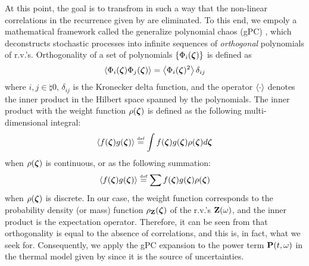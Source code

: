 At this point, the goal is to transfrom  in such a way that the non-linear correlations in the recurrence given by  are eliminated. To this end, we empoly a mathematical framework called the generalize polynomial chaos (gPC) \cite{xiu2002}, which deconstructs stochastic processes into infinite sequences of \emph{orthogonal} polynomials of r.v.'s. Orthogonality of a set of polynomials $\{ \Phi_i(\boldsymbol{\zeta}) \}$ is defined as
\begin{equation} \elabel{orthogonality}
  \oInner{\pcb_i(\vz) \pcb_j(\vz)} = \oInner{\pcb_i(\vz)^2} \delta_{ij}
\end{equation}
where $i,j \in \natural{0}$, $\delta_{ij}$ is the Kronecker delta function, and the operator $\left\langle \cdot \right\rangle$ denotes the inner product in the Hilbert space spanned by the polynomials. The inner product with the weight function $\rho(\boldsymbol{\zeta})$ is defined as the following multi-dimensional integral:
\begin{equation} \elabel{inner-product-integral}
  \oInner{f(\vz) g(\vz)} \eqdef \int f(\vz) g(\vz) \pdf(\vz) d\vz
\end{equation}
when $\rho(\boldsymbol{\zeta})$ is continuous, or as the following summation:
\begin{equation} \elabel{inner-product-sum}
  \oInner{f(\vz) g(\vz)} \eqdef \sum f(\vz) g(\vz) \pdf(\vz)
\end{equation}
when $\rho(\boldsymbol{\zeta})$ is discrete. In our case, the weight function corresponds to the probability density (or mass) function $\rho_{\mathbf{Z}}(\boldsymbol{\zeta})$ of the r.v.'s $\mathbf{Z}(\omega)$, and the inner product is the expectation operator. Therefore, it can be seen from  that orthogonality is equal to the absence of correlations, and this is, in fact, what we seek for. Consequently, we apply the gPC expansion to the power term $\mathbf{P}(t, \omega)$ in the thermal model given by  since it is the source of uncertainties.

